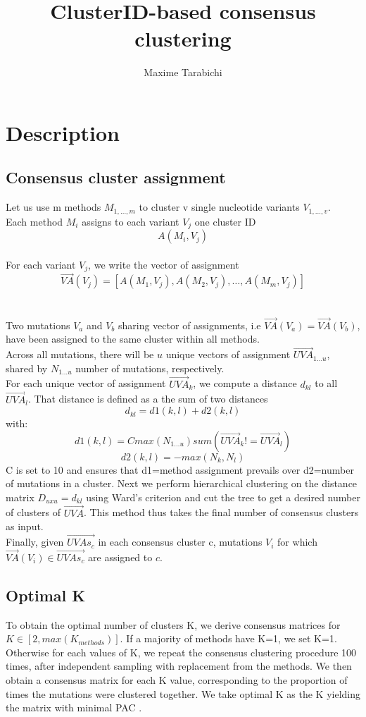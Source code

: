 \documentclass{article}\usepackage[]{graphicx}\usepackage[]{color}
\begin{document}
\title{ClusterID-based consensus clustering}

\author{Maxime Tarabichi}
\maketitle

\section*{Description}
\subsection*{Consensus cluster assignment}
Let us use m methods \(M_{1,\dotsc, m}\) to cluster v single
nucleotide variants
\(V_{1,\dotsc, v}\). \\
Each method \(M_i\) assigns to each variant \(V_j\) one
cluster ID \[A(M_i,V_j)\]\\
For each variant \(V_j\), we write the vector of
assignment\\
\[\vec{VA}(V_j)=[A(M_1,V_j), A(M_2, V_j), \dotsc, A(M_m, V_j)]\] \\ \\
Two mutations \(V_a\) and \(V_b\) sharing vector of assignments, i.e
\(\vec{VA}(V_a)=\vec{VA}(V_b)\), have been assigned to the same cluster within all
methods. \\
Across all mutations, there will be \(u\) unique vectors
of assignment \(\vec{UVA}_{1\dotsc u}\), shared by \(N_{1\dotsc u}\) number of
mutations, respectively. \\
For each unique vector of assignment \(\vec{UVA}_k\), we
compute a distance \(d_{kl}\) to all \(\vec{UVA}_l\).
That distance is defined as a the sum of two distances
\[d_{kl}=d1(k,l)+d2(k,l)\]with:\\
\[d1(k,l)=Cmax(N_{1\dotsc u})sum{(\vec{UVA}_k!=\vec{UVA}_l)}\]
\[d2(k,l)=-max(N_k,N_l)\]
C is set to 10 and ensures that d1=method assignment prevails over
d2=number of mutations in a cluster.
Next we perform hierarchical clustering on the distance matrix
\(D_{uxu}=d_{kl}\) using Ward's criterion and cut the tree to
get a desired number of clusters of \(\vec{UVA}\). This method thus takes
the final number of consensus clusters as input.\\
Finally,  given \(\vec{UVAs_c}\) in each consensus cluster c,
mutations \(V_i\) for which \(\vec{VA}(V_i)\in \vec{UVAs_c}\) are
assigned to \(c\). \\
\subsection*{Optimal K}
To obtain the optimal number of clusters K, we derive consensus matrices for
\(K\in[2,max(K_{methods})]\). If a majority of methods have K=1,
we set K=1. Otherwise for each values of K, we repeat the consensus
clustering procedure 100 times, after independent sampling with
replacement from the methods. We then obtain a consensus matrix for
each K value, corresponding to the proportion of times the mutations were
clustered together. We take optimal K as the K yielding the matrix with
minimal PAC \cite{senbabaoglu_critical_2014}.\\
\end{document}
